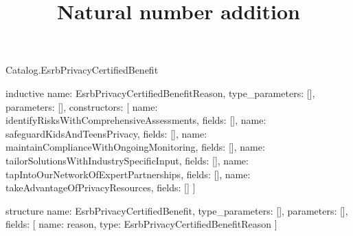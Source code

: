 \begin{lexlean}{Catalog.EsrbPrivacyCertifiedBenefit}
\title{Natural number addition}
\begin{semanticmodule}
inductive{
  name: EsrbPrivacyCertifiedBenefitReason,
  type_parameters: [],
  parameters: [],
  constructors: [
    {name: identifyRisksWithComprehensiveAssessments, fields: []},
    {name: safeguardKidsAndTeensPrivacy, fields: []},
    {name: maintainComplianceWithOngoingMonitoring, fields: []},
    {name: tailorSolutionsWithIndustrySpecificInput, fields: []},
    {name: tapIntoOurNetworkOfExpertPartnerships, fields: []},
    {name: takeAdvantageOfPrivacyResources, fields: []}
  ]
}

structure{
  name: EsrbPrivacyCertifiedBenefit,
  type_parameters: [],
  parameters: [],
  fields: [
    {name: reason, type: EsrbPrivacyCertifiedBenefitReason}
  ]
}
\end{semanticmodule}
\end{lexlean}
